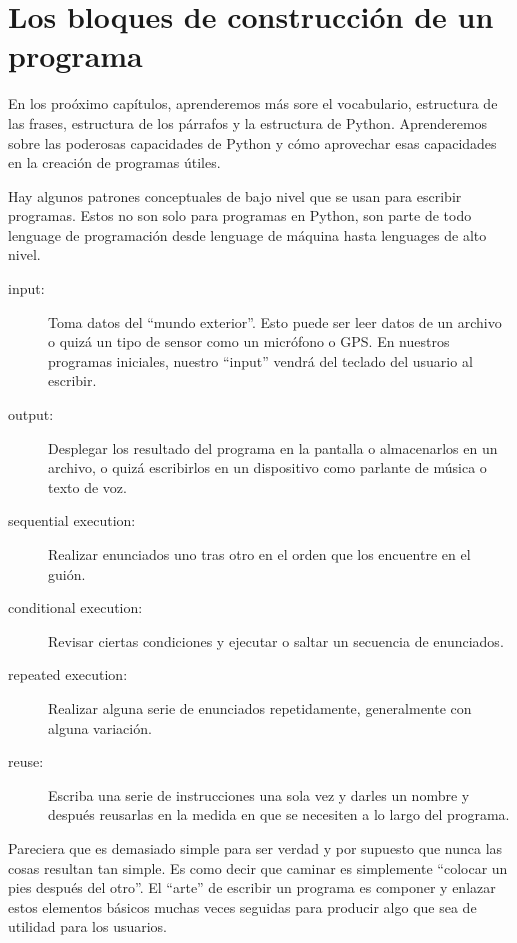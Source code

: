 \section{Los bloques de construcci\'on de un programa}

En los pro\'oximo cap\'itulos, aprenderemos m\'as sore el vocabulario, estructura de las frases, estructura de los p\'arrafos y la estructura de Python. Aprenderemos sobre las poderosas capacidades de Python y c\'omo aprovechar esas capacidades en la creaci\'on de programas \'utiles.

Hay algunos patrones conceptuales de bajo nivel que se usan para escribir programas. Estos no son solo para programas en Python, son parte de todo lenguage de programaci\'on desde lenguage de m\'aquina hasta lenguages de alto nivel.

\begin{description}

\item[input:] Toma datos del ``mundo exterior''. Esto puede ser leer datos de un archivo o quiz\'a un tipo de sensor como un micr\'ofono o GPS. En nuestros programas iniciales, nuestro ``input'' vendr\'a del teclado del usuario al escribir.

\item[output:] Desplegar los resultado del programa en la pantalla o almacenarlos en un archivo, o quiz\'a escribirlos en un dispositivo como parlante de m\'usica o texto de voz.

\item[sequential execution:] Realizar enunciados uno tras otro en el orden que los encuentre en el gui\'on.

\item[conditional execution:] Revisar ciertas condiciones y ejecutar o saltar un secuencia de enunciados.

\item[repeated execution:] Realizar alguna serie de enunciados repetidamente, generalmente con alguna variaci\'on.

\item[reuse:] Escriba una serie de instrucciones una sola vez y darles un nombre y despu\'es reusarlas en la medida en que se necesiten a lo largo del programa.

\end{description}

Pareciera que es demasiado simple para ser verdad y por supuesto que nunca las cosas resultan tan simple. Es como decir que caminar es simplemente
``colocar un pies despu\'es del otro''. El ``arte'' 
de escribir un programa es componer y enlazar estos elementos b\'asicos muchas veces seguidas para producir algo que sea de utilidad para los usuarios.

